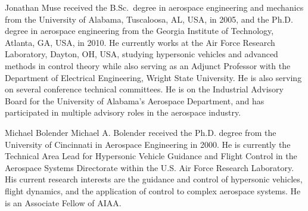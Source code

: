 \documentclass[journal]{IEEEtran}
\newcommand{\figurepath}{../fig/bio}
\begin{document}
\begin{multicols}{2}
    \begin{IEEEbiography}{Jonathan Muse}
      received the B.Sc.\ degree in aerospace engineering and mechanics from the University of Alabama, Tuscaloosa, AL, USA, in 2005, and the Ph.D. degree in aerospace engineering from the Georgia Institute of Technology, Atlanta, GA, USA, in 2010.
      He currently works at the Air Force Research Laboratory, Dayton, OH, USA, studying hypersonic vehicles and advanced methods in control theory while also serving as an Adjunct Professor with the Department of Electrical Engineering, Wright State University.
      He is also serving on several conference technical committees.
      He is on the Industrial Advisory Board for the University of Alabama's Aerospace Department, and has participated in multiple advisory roles in the aerospace industry.
    \end{IEEEbiography}

    \begin{IEEEbiography}{Michael Bolender}
      Michael A. Bolender received the Ph.D. degree from the University of Cincinnati in Aerospace Engineering in 2000.
      He is currently the Technical Area Lead for Hypersonic Vehicle Guidance and Flight Control in the Aerospace Systems Directorate within the U.S. Air Force Research Laboratory.
      His current research interests are the guidance and control of hypersonic vehicles, flight dynamics, and the application of control to complex aerospace systems.
      He is an Associate Fellow of AIAA.\@
    \end{IEEEbiography}


\end{multicols}
\end{document}
